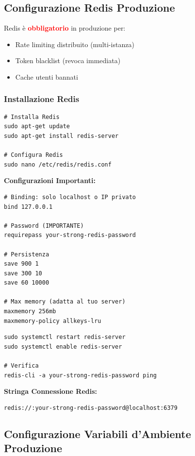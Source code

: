 \documentclass[11pt,a4paper]{article}
\newcommand{\important}[1]{\textcolor{red}{\textbf{#1}}}
\begin{document}
\subsection{Configurazione Redis Produzione}

Redis è \important{obbligatorio} in produzione per:
\begin{itemize}
    \item Rate limiting distribuito (multi-istanza)
    \item Token blacklist (revoca immediata)
    \item Cache utenti bannati
\end{itemize}

\subsubsection{Installazione Redis}

\begin{lstlisting}[caption=Installazione Redis]
# Installa Redis
sudo apt-get update
sudo apt-get install redis-server

# Configura Redis
sudo nano /etc/redis/redis.conf
\end{lstlisting}

\textbf{Configurazioni Importanti:}
\begin{lstlisting}[caption=/etc/redis/redis.conf]
# Binding: solo localhost o IP privato
bind 127.0.0.1

# Password (IMPORTANTE)
requirepass your-strong-redis-password

# Persistenza
save 900 1
save 300 10
save 60 10000

# Max memory (adatta al tuo server)
maxmemory 256mb
maxmemory-policy allkeys-lru
\end{lstlisting}

\begin{lstlisting}[caption=Avvio Redis]
sudo systemctl restart redis-server
sudo systemctl enable redis-server

# Verifica
redis-cli -a your-strong-redis-password ping
\end{lstlisting}

\textbf{Stringa Connessione Redis:}
\begin{lstlisting}
redis://:your-strong-redis-password@localhost:6379
\end{lstlisting}

\subsection{Configurazione Variabili d'Ambiente Produzione}
\end{document}
